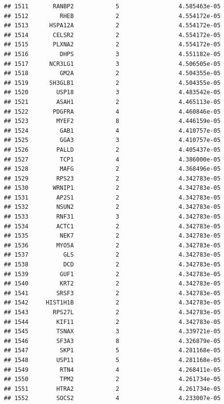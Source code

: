 \documentclass[
]{article}
\begin{document}
\begin{verbatim}
## 1511       RANBP2            5                 4.585463e-05
## 1512         RHEB            2                 4.554172e-05
## 1513      HSPA12A            2                 4.554172e-05
## 1514       CELSR2            2                 4.554172e-05
## 1515       PLXNA2            2                 4.554172e-05
## 1516         DHPS            3                 4.551182e-05
## 1517      NCR3LG1            3                 4.506505e-05
## 1518         GM2A            2                 4.504355e-05
## 1519      SH3GLB1            2                 4.504355e-05
## 1520        USP18            3                 4.483542e-05
## 1521        ASAH1            2                 4.465113e-05
## 1522       PDGFRA            4                 4.460846e-05
## 1523        MYEF2            8                 4.446159e-05
## 1524         GAB1            4                 4.410757e-05
## 1525         GGA3            3                 4.410757e-05
## 1526        PALLD            2                 4.405437e-05
## 1527         TCP1            4                 4.386000e-05
## 1528         MAFG            2                 4.368496e-05
## 1529        RPS23            2                 4.342783e-05
## 1530       WRNIP1            2                 4.342783e-05
## 1531        AP2S1            2                 4.342783e-05
## 1532        NSUN2            2                 4.342783e-05
## 1533        RNF31            3                 4.342783e-05
## 1534        ACTC1            2                 4.342783e-05
## 1535         NEK7            2                 4.342783e-05
## 1536        MYO5A            2                 4.342783e-05
## 1537          GLS            2                 4.342783e-05
## 1538          DCD            2                 4.342783e-05
## 1539         GUF1            2                 4.342783e-05
## 1540         KRT2            2                 4.342783e-05
## 1541        SRSF3            2                 4.342783e-05
## 1542     HIST1H1B            2                 4.342783e-05
## 1543       RPS27L            2                 4.342783e-05
## 1544        KIF11            2                 4.342783e-05
## 1545        TSNAX            3                 4.339721e-05
## 1546        SF3A3            8                 4.326879e-05
## 1547         SKP1            5                 4.281168e-05
## 1548        USP11            5                 4.281168e-05
## 1549         RTN4            4                 4.268411e-05
## 1550         TPM2            2                 4.261734e-05
## 1551        HTRA2            2                 4.261734e-05
## 1552        SOCS2            4                 4.233007e-05

\end{verbatim}
\end{document}
